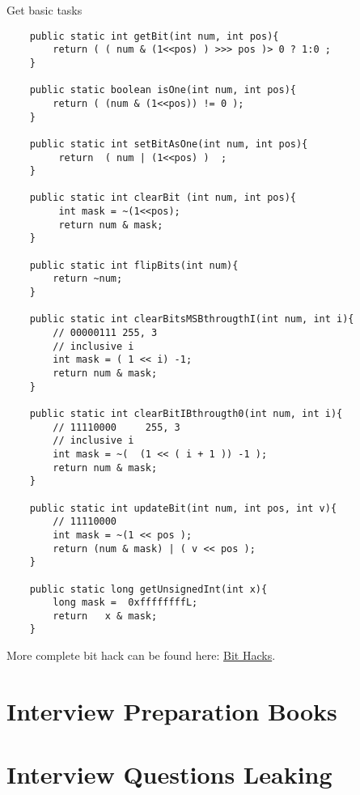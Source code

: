 Get basic tasks
\begin{lstlisting} 
    public static int getBit(int num, int pos){
		return ( ( num & (1<<pos) ) >>> pos )> 0 ? 1:0 ;
	}
	
	public static boolean isOne(int num, int pos){
		return ( (num & (1<<pos)) != 0 );
	}
	
	public static int setBitAsOne(int num, int pos){
		 return  ( num | (1<<pos) )  ;
	}
	
	public static int clearBit (int num, int pos){
		 int mask = ~(1<<pos);
		 return num & mask;
	}
	
	public static int flipBits(int num){
		return ~num;
	}
	
	public static int clearBitsMSBthrougthI(int num, int i){
		// 00000111 255, 3
		// inclusive i
		int mask = ( 1 << i) -1;
		return num & mask;
	}
	
	public static int clearBitIBthrougth0(int num, int i){
		// 11110000     255, 3
		// inclusive i
		int mask = ~(  (1 << ( i + 1 )) -1 );
		return num & mask;
	}
	
	public static int updateBit(int num, int pos, int v){
		// 11110000
		int mask = ~(1 << pos );
		return (num & mask) | ( v << pos );
	}

    public static long getUnsignedInt(int x){		
		long mask =  0xffffffffL;
		return   x & mask;		
	}

\end{lstlisting}

More complete bit hack can be found here: 
\href{http://graphics.stanford.edu/~seander/bithacks.html}{Bit Hacks}.

\section{Interview Preparation Books }

 

\section{Interview Questions Leaking }


